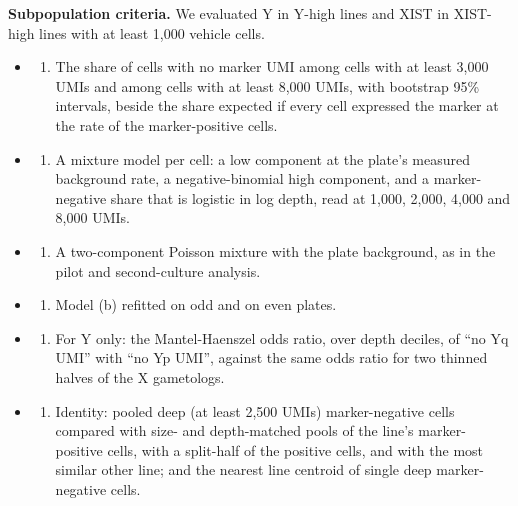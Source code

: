 \documentclass[
  11pt,
  letterpaper,
]{article}
\providecommand{\tightlist}{%
  \setlength{\itemsep}{0pt}\setlength{\parskip}{0pt}}
\begin{document}
\textbf{Subpopulation criteria.} We evaluated Y in Y-high lines and XIST
in XIST-high lines with at least 1,000 vehicle cells.

\begin{itemize}
\tightlist
\item
  \begin{enumerate}
  \def\labelenumi{(\alph{enumi})}
  \tightlist
  \item
    The share of cells with no marker UMI among cells with at least
    3,000 UMIs and among cells with at least 8,000 UMIs, with bootstrap
    95\% intervals, beside the share expected if every cell expressed
    the marker at the rate of the marker-positive cells.
  \end{enumerate}
\item
  \begin{enumerate}
  \def\labelenumi{(\alph{enumi})}
  \setcounter{enumi}{1}
  \tightlist
  \item
    A mixture model per cell: a low component at the plate's measured
    background rate, a negative-binomial high component, and a
    marker-negative share that is logistic in log depth, read at 1,000,
    2,000, 4,000 and 8,000 UMIs.
  \end{enumerate}
\item
  \begin{enumerate}
  \def\labelenumi{(\alph{enumi})}
  \setcounter{enumi}{2}
  \tightlist
  \item
    A two-component Poisson mixture with the plate background, as in the
    pilot and second-culture analysis.
  \end{enumerate}
\item
  \begin{enumerate}
  \def\labelenumi{(\alph{enumi})}
  \setcounter{enumi}{3}
  \tightlist
  \item
    Model (b) refitted on odd and on even plates.
  \end{enumerate}
\item
  \begin{enumerate}
  \def\labelenumi{(\alph{enumi})}
  \setcounter{enumi}{4}
  \tightlist
  \item
    For Y only: the Mantel-Haenszel odds ratio, over depth deciles, of
    ``no Yq UMI'' with ``no Yp UMI'', against the same odds ratio for
    two thinned halves of the X gametologs.
  \end{enumerate}
\item
  \begin{enumerate}
  \def\labelenumi{(\alph{enumi})}
  \setcounter{enumi}{5}
  \tightlist
  \item
    Identity: pooled deep (at least 2,500 UMIs) marker-negative cells
    compared with size- and depth-matched pools of the line's
    marker-positive cells, with a split-half of the positive cells, and
    with the most similar other line; and the nearest line centroid of
    single deep marker-negative cells.
  \end{enumerate}
\end{itemize}
\end{document}
